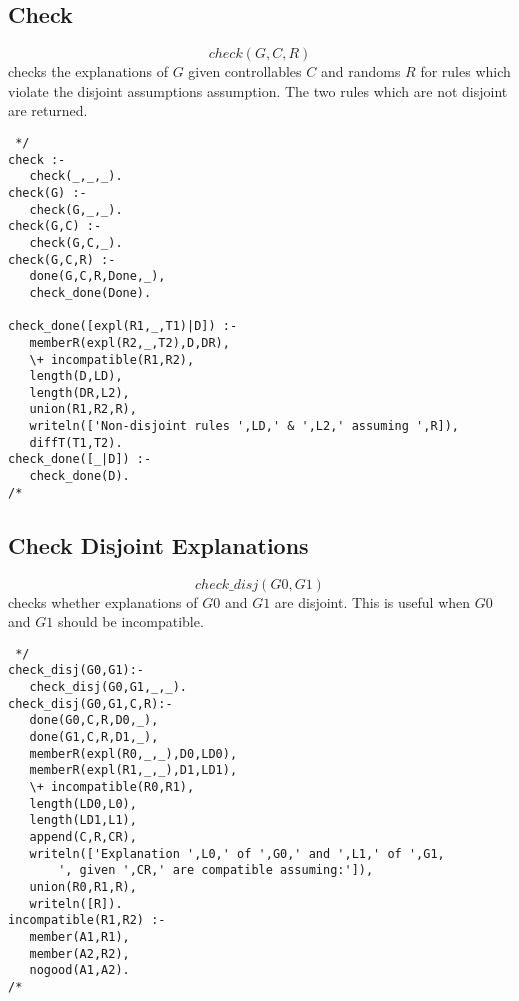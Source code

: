 \documentclass[11pt,fleqn]{article}
\begin{document}
\subsection{Check}
\[check(G,C,R)\] 
checks the explanations of $G$ given controllables $C$ and randoms $R$ 
for rules which violate the disjoint
assumptions assumption. The two rules which are not disjoint are returned.

\begin{verbatim} */
check :- 
   check(_,_,_).
check(G) :-
   check(G,_,_).
check(G,C) :-
   check(G,C,_).
check(G,C,R) :-
   done(G,C,R,Done,_),
   check_done(Done).

check_done([expl(R1,_,T1)|D]) :-
   memberR(expl(R2,_,T2),D,DR),
   \+ incompatible(R1,R2),
   length(D,LD),
   length(DR,L2),
   union(R1,R2,R),
   writeln(['Non-disjoint rules ',LD,' & ',L2,' assuming ',R]),
   diffT(T1,T2).
check_done([_|D]) :-
   check_done(D).
/* \end{verbatim}

\subsection{Check Disjoint Explanations}
\[check\_disj(G0,G1)\] 
checks whether explanations of $G0$ and $G1$ are disjoint. This is useful when $G0$ and $G1$ should be incompatible.
\begin{verbatim} */
check_disj(G0,G1):-
   check_disj(G0,G1,_,_).
check_disj(G0,G1,C,R):-
   done(G0,C,R,D0,_),
   done(G1,C,R,D1,_),
   memberR(expl(R0,_,_),D0,LD0),
   memberR(expl(R1,_,_),D1,LD1),
   \+ incompatible(R0,R1),
   length(LD0,L0),
   length(LD1,L1),
   append(C,R,CR),
   writeln(['Explanation ',L0,' of ',G0,' and ',L1,' of ',G1,
       ', given ',CR,' are compatible assuming:']),
   union(R0,R1,R),
   writeln([R]).
incompatible(R1,R2) :-
   member(A1,R1),
   member(A2,R2),
   nogood(A1,A2).
/* \end{verbatim}
\end{document}
